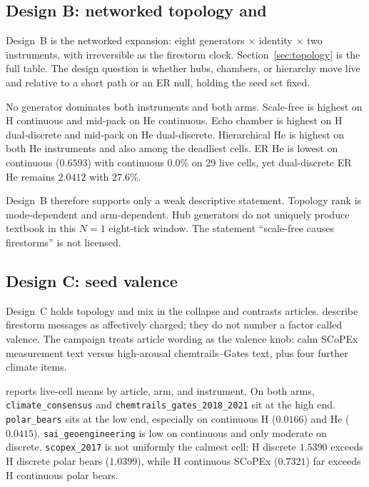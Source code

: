 \subsection{Design B: networked topology and \texorpdfstring{\kstar{}}{k*}}

Design~B is the networked expansion: eight generators $\times$ identity $\times$ two instruments, with irreversible \kstar{} as the firestorm clock.
Section~\ref{sec:topology} is the full table.
The design question is whether hubs, chambers, or hierarchy move live \MPR{} and \kstar{} relative to a short path or an ER null, holding the seed set fixed.

No generator dominates both instruments and both arms.
Scale-free is highest on H continuous and mid-pack on He continuous.
Echo chamber is highest on H dual-discrete and mid-pack on He dual-discrete.
Hierarchical He is highest on both He instruments and also among the deadliest cells.
ER He is lowest on continuous \MPR{} ($0.6593$) with continuous \kstar{} $0.0\%$ on 29 live cells, yet dual-discrete ER He remains $2.0412$ with \kstar{} $27.6\%$.

Design~B therefore supports only a weak descriptive statement.
Topology rank is mode-dependent and arm-dependent.
Hub generators do not uniquely produce textbook \kstar{} in this $N=1$ eight-tick window.
The statement \enquote{scale-free causes firestorms} is not licensed.

\subsection{Design C: seed valence}

Design~C holds topology and mix in the collapse and contrasts articles.
\textcite{pfeffer2014firestorms} describe firestorm messages as affectively charged; they do not number a factor called valence.
The campaign treats article wording as the valence knob: calm SCoPEx measurement text versus high-arousal chemtrails--Gates text, plus four further climate items.

 reports live-cell means by article, arm, and instrument.
On both arms, \texttt{climate\_consensus} and \texttt{chemtrails\_gates\_2018\_2021} sit at the high end.
\texttt{polar\_bears} sits at the low end, especially on continuous H ($0.0166$) and He ($0.0415$).
\texttt{sai\_geoengineering} is low on continuous and only moderate on discrete.
\texttt{scopex\_2017} is not uniformly the calmest cell: H discrete $1.5390$ exceeds H discrete polar bears ($1.0399$), while H continuous SCoPEx ($0.7321$) far exceeds H continuous polar bears.

